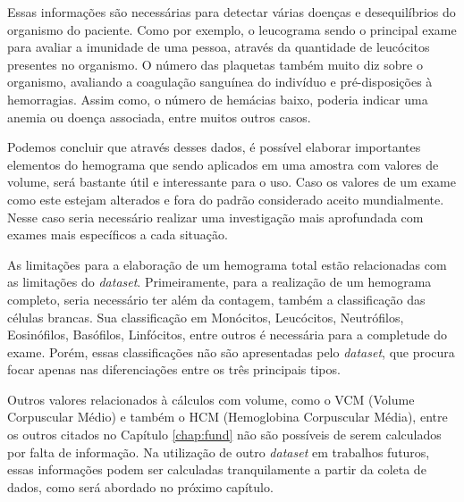 Essas informações são necessárias para detectar várias doenças e desequilíbrios do organismo do paciente. Como por exemplo, o leucograma sendo o principal exame para avaliar a imunidade de uma pessoa, através da quantidade de leucócitos presentes no organismo. O número das plaquetas também muito diz sobre o organismo, avaliando a coagulação sanguínea do indivíduo e pré-disposições à hemorragias. Assim como, o número de hemácias baixo, poderia indicar uma anemia ou doença associada, entre muitos outros casos.

Podemos concluir que através desses dados, é possível elaborar importantes elementos do hemograma que sendo aplicados em uma amostra com valores de volume, será bastante útil e interessante para o uso. Caso os valores de um exame como este estejam alterados e fora do padrão considerado aceito mundialmente. Nesse caso seria necessário realizar uma investigação mais aprofundada com exames mais específicos a cada situação.

As limitações para a elaboração de um hemograma total estão relacionadas com as limitações do \emph{dataset}. Primeiramente, para a realização de um hemograma completo, seria necessário ter além da contagem, também a classificação das células brancas. Sua classificação em Monócitos, Leucócitos, Neutrófilos, Eosinófilos, Basófilos, Linfócitos, entre outros é necessária para a completude do exame. Porém, essas classificações não são apresentadas pelo \emph{dataset}, que procura focar apenas nas diferenciações entre os três principais tipos.

Outros valores relacionados à cálculos com volume, como o VCM (Volume Corpuscular Médio) e também o HCM (Hemoglobina Corpuscular Média), entre os outros citados no Capítulo \ref{chap:fund} não são possíveis de serem calculados por falta de informação. Na utilização de outro \emph{dataset} em trabalhos futuros, essas informações podem ser calculadas tranquilamente a partir da coleta de dados, como será abordado no próximo capítulo. 
